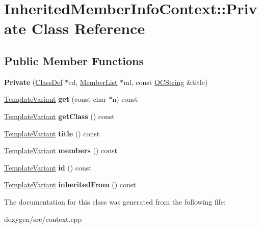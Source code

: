 \hypertarget{class_inherited_member_info_context_1_1_private}{}\section{Inherited\+Member\+Info\+Context\+::Private Class Reference}
\label{class_inherited_member_info_context_1_1_private}
\subsection*{Public Member Functions}
\begin{DoxyCompactItemize}
\item 
\mbox{\label{class_inherited_member_info_context_1_1_private_a010345156893089029a59b471e68ac4e}} 
{\bfseries Private} (\mbox{\hyperlink{class_class_def}{Class\+Def}} $\ast$cd, \mbox{\hyperlink{class_member_list}{Member\+List}} $\ast$ml, const \mbox{\hyperlink{class_q_c_string}{Q\+C\+String}} \&title)
\item 
\mbox{\label{class_inherited_member_info_context_1_1_private_aa8ebb9055bb0142494b2a12a07413216}} 
\mbox{\hyperlink{class_template_variant}{Template\+Variant}} {\bfseries get} (const char $\ast$n) const
\item 
\mbox{\label{class_inherited_member_info_context_1_1_private_ae9fe338bd9d36d5a23161d0f75047fcb}} 
\mbox{\hyperlink{class_template_variant}{Template\+Variant}} {\bfseries get\+Class} () const
\item 
\mbox{\label{class_inherited_member_info_context_1_1_private_a92f6703d5899c05800ffa81501f87d8f}} 
\mbox{\hyperlink{class_template_variant}{Template\+Variant}} {\bfseries title} () const
\item 
\mbox{\label{class_inherited_member_info_context_1_1_private_ac48fbd0a9db100367b3921a12a7151b5}} 
\mbox{\hyperlink{class_template_variant}{Template\+Variant}} {\bfseries members} () const
\item 
\mbox{\label{class_inherited_member_info_context_1_1_private_a7dda3ce5ea4651de7b6a316dcca5c2c8}} 
\mbox{\hyperlink{class_template_variant}{Template\+Variant}} {\bfseries id} () const
\item 
\mbox{\label{class_inherited_member_info_context_1_1_private_ad644008438f3f32111f0423b48770fa3}} 
\mbox{\hyperlink{class_template_variant}{Template\+Variant}} {\bfseries inherited\+From} () const
\end{DoxyCompactItemize}


The documentation for this class was generated from the following file\+:\begin{DoxyCompactItemize}
\item 
doxygen/src/context.\+cpp\end{DoxyCompactItemize}
